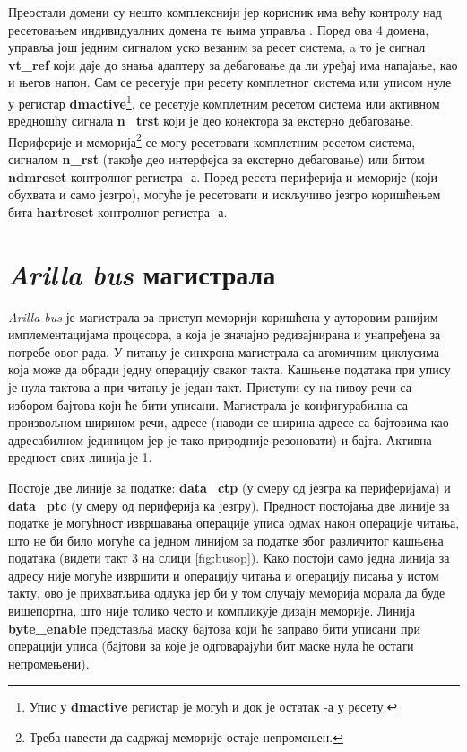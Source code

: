 Преостали домени су нешто комплекснији јер корисник има већу контролу над ресетовањем индивидуалних домена те њима управља . Поред ова 4 домена,  управља још једним сигналом уско везаним за ресет система, a то је сигнал \textbf{vt\_ref} који даје до знања адаптеру за дебаговање да ли уређај има напајање, као и његов напон.
Сам  се ресетује при ресету комплетног система или уписом нуле у регистар \textbf{dmactive}\footnote{Упис у \textbf{dmactive} регистар је могућ и док је остатак -а у ресету.}.
 се ресетује комплетним ресетом система или активном вредношћу сигнала \textbf{n\_trst} који је део конектора за екстерно дебаговање.
Периферије и меморија\footnote{Треба навести да садржај меморије остаје непромењен.} се могу ресетовати комплетним ресетом система, сигналом \textbf{n\_rst} (такође део интерфејса за екстерно дебаговање) или битом \textbf{ndmreset} контролног регистра -а.
Поред ресета периферија и меморије (који обухвата и само језгро), могуће је ресетовати и искључиво језгро коришћењем бита \textbf{hartreset} контролног регистра -а.

\section{\textit{Arilla bus} магистрала}

\textit{Arilla bus} је магистрала за приступ меморији коришћена у ауторовим ранијим имплементацијама  процесора\cite{arilla}, а која је значајно редизајнирана и унапређена за потребе овог рада. У питању је синхрона магистрала са атомичним циклусима која може да обради једну операцију сваког такта. Кашњење података при упису је нула тактова а при читању је један такт. Приступи су на нивоу речи са избором бајтова који ће бити уписани.
Магистрала је конфигурабилна са произвољном ширином речи, адресе (наводи се ширина адресе са бајтовима као адресабилном јединицом јер је тако природније резоновати) и бајта. Активна вредност свих линија је 1.



Постоје две линије за податке: \textbf{data\_ctp} (у смеру од језгра ка периферијама) и \textbf{data\_ptc} (у смеру од периферија ка језгру). Предност постојања две линије за податке је могућност извршавања операције уписа одмах након операције читања, што не би било могуће са једном линијом за податке због различитог кашњења података (видети такт 3 на слици \ref{fig:busop}). Како постоји само једна линија за адресу није могуће извршити и операцију читања и операцију писања у истом такту, ово је прихватљива одлука јер би у том случају меморија морала да буде вишепортна, што није толико често и компликује дизајн меморије. Линија \textbf{byte\_enable} представља маску бајтова који ће заправо бити уписани при операцији уписа (бајтови за које је одговарајући бит маске нула ће остати непромењени).

